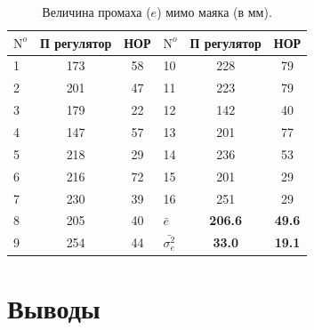 \begin{table}
\caption{Величина промаха ($e$) мимо маяка (в мм).}\label{tabl:moby_pc_noc_cmp}
\centering
\begin{tabular}{|l|c|c||l|c|c|}
\hline
$\mathrm{N}^o$ & П регулятор & НОР & $\mathrm{N}^o$ & П регулятор & НОР \\
\hline
1&	173&	58& 10&	228&	79\\
2&	201&	47& 11&	223&	79\\
3&	179&	22& 12&	142&	40\\
4&	147&	57& 13&	201&	77\\
5&	218&	29& 14&	236&	53\\
6&	216&	72& 15&	201&	29\\
7&	230&	39& 16&	251&	29\\
\cline{4-6}
8&	205&	40& $\bar e$ & {\bf 206.6}&	{\bf 49.6}\\
9&	254&	44& $\bar{\sigma^2_e}$& {\bf 33.0} &	{\bf 19.1}\\
\hline
\end{tabular}
\end{table}

\section{Выводы}

